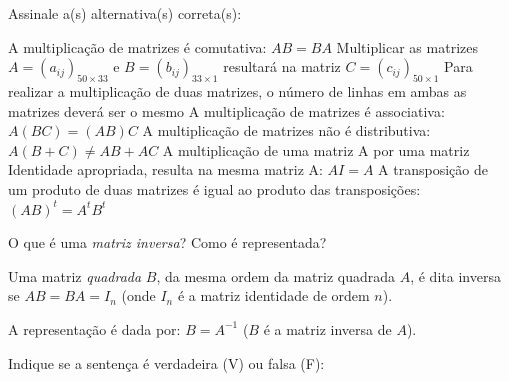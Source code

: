 \documentclass[pdftex, brazil, 12pt, oneside, addpoints]{exam}
\newcommand{\vf}[1][{}]{%
  \fillin[#1][0.25in]%
}
\begin{document}
\begin{questions}
\question
Assinale a(s) alternativa(s) correta(s):
\begin{checkboxes}
  \choice A multiplicação de matrizes é comutativa: $AB = BA$
  \CorrectChoice Multiplicar as matrizes $A = (a_{ij})_{50 \times 33}$ e $B = (b_{ij})_{33 \times 1}$
  resultará na matriz $C = (c_{ij})_{50 \times 1}$
  \choice Para realizar a multiplicação de duas matrizes, o número de linhas
  em ambas as matrizes deverá ser o mesmo
  \CorrectChoice A multiplicação de matrizes é associativa: $A(BC) = (AB)C$
  \choice A multiplicação de matrizes não é distributiva: $A(B + C) \ne AB + AC$
  \CorrectChoice A multiplicação de uma matriz A por uma matriz Identidade apropriada,
  resulta na mesma matriz A: $AI = A$
  \CorrectChoice A transposição de um produto de duas matrizes é igual ao produto
  das transposições: $(AB)^t = A^tB^t$
\end{checkboxes}


\ifprintanswers
\newpage
\fi
{}

\question
O que é uma \emph{matriz inversa}? Como é representada?
\begin{solutionorlines}[0.50in]
  Uma matriz \emph{quadrada} $B$, da mesma ordem da matriz quadrada $A$, é dita inversa
  se $AB = BA = I_n$ (onde $I_n$ é a matriz identidade de ordem $n$).

  A representação é dada por: $B = A^{-1}$ ($B$ é a matriz inversa de $A$).
\end{solutionorlines}

\question
Indique se a sentença é verdadeira (V) ou falsa (F):
\end{questions}
\end{document}
